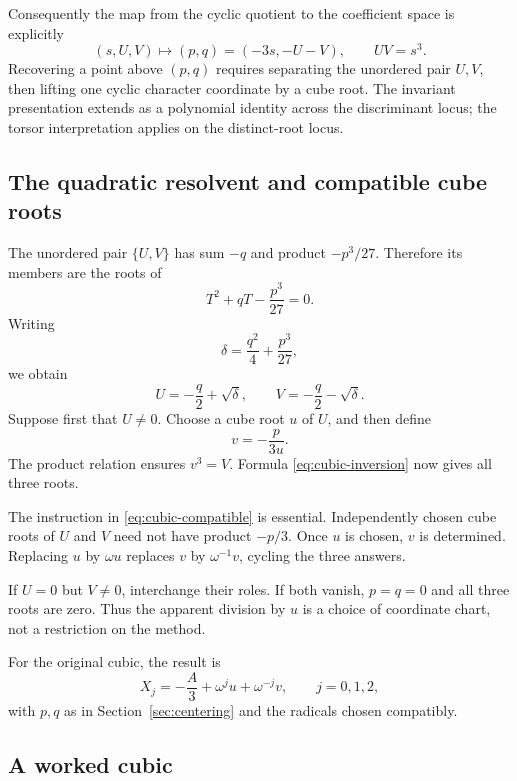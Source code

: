 \documentclass[11pt]{article}
\theoremstyle{remark}
\begin{document}
Consequently the map from the cyclic quotient to the coefficient space is explicitly
\[
(s,U,V)\longmapsto(p,q)=(-3s,-U-V),
\qquad UV=s^3.
\]
Recovering a point above \((p,q)\) requires separating the unordered pair \(U,V\), then lifting one cyclic character coordinate by a cube root. The invariant presentation extends as a polynomial identity across the discriminant locus; the torsor interpretation applies on the distinct-root locus.


\subsection{The quadratic resolvent and compatible cube roots}

The unordered pair \(\{U,V\}\) has sum \(-q\) and product \(-p^3/27\). Therefore its members are the roots of
\begin{equation}
T^2+qT-\frac{p^3}{27}=0.
\label{eq:cubic-resolvent}
\end{equation}
Writing
\[
\delta=\frac{q^2}{4}+\frac{p^3}{27},
\]
we obtain
\[
U=-\frac q2+\sqrt\delta,\qquad
V=-\frac q2-\sqrt\delta.
\]
Suppose first that \(U\ne0\). Choose a cube root \(u\) of \(U\), and then define
\begin{equation}
v=-\frac{p}{3u}.
\label{eq:cubic-compatible}
\end{equation}
The product relation ensures \(v^3=V\). Formula \eqref{eq:cubic-inversion} now gives all three roots.

The instruction in \eqref{eq:cubic-compatible} is essential. Independently chosen cube roots of \(U\) and \(V\) need not have product \(-p/3\). Once \(u\) is chosen, \(v\) is determined. Replacing \(u\) by \(\omega u\) replaces \(v\) by \(\omega^{-1}v\), cycling the three answers.

If \(U=0\) but \(V\ne0\), interchange their roles. If both vanish, \(p=q=0\) and all three roots are zero. Thus the apparent division by \(u\) is a choice of coordinate chart, not a restriction on the method.

For the original cubic, the result is
\begin{equation}
X_j=-\frac A3+\omega^ju+\omega^{-j}v,\qquad j=0,1,2,
\label{eq:cardano-final}
\end{equation}
with \(p,q\) as in Section~\ref{sec:centering} and the radicals chosen compatibly.

\subsection{A worked cubic}
\end{document}
